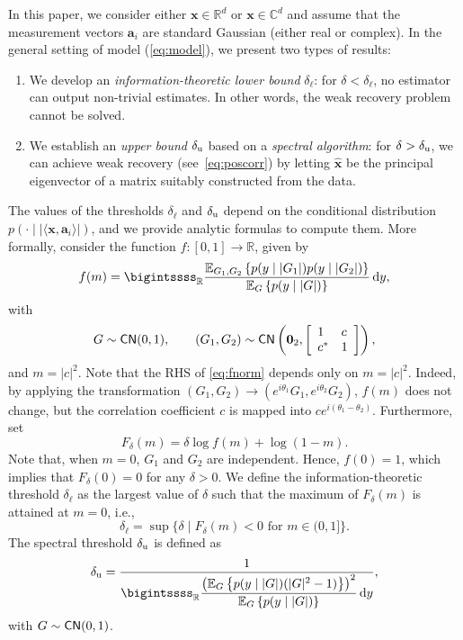 \documentclass[final,12pt]{colt2018}
\def\complex{{\mathbb C}}
\def\reals{{\mathbb R}}
\def\reals{{\mathbb R}}
\def\ba{{\boldsymbol a}}
\def\bx{{\boldsymbol x}}
\def\b0{{\boldsymbol 0}}
\def\cnormal{{\sf CN}}
\def\complex{{\mathbb C}}
\begin{document}
In this paper, we consider either $\bx\in \reals^d$ or $\bx\in\complex^d$ and assume that the measurement vectors
$\ba_i$ are standard Gaussian (either real or complex). In the general setting of model (\ref{eq:model}), we present two types of results:
%
\begin{enumerate}
\item We develop an \emph{information-theoretic lower bound} $\delta_{\ell}$: for $\delta < \delta_{\ell}$, no estimator can output non-trivial estimates.
In other words, the weak recovery problem cannot be solved. 
%
\item We establish an  \emph{upper bound} $\delta_{\rm u}$ based on a \emph{spectral algorithm}:
for $\delta > \delta_{\rm u}$, we can achieve weak recovery (see~\eqref{eq:poscorr}) by letting $\hat{\bx}$ be the principal
eigenvector of a matrix suitably constructed from the data.
%
\end{enumerate}
%
The values of the thresholds $\delta_{\ell}$ and $\delta_{\rm u}$ depend on the conditional distribution $p(\cdot \mid |\langle\bx, \ba_i \rangle|)$, and we provide analytic formulas to compute them. More formally, consider the function $f : [0, 1]\to {\mathbb R}$, given by 
\begin{equation}\label{eq:fnorm}
f(m) = \bigintssss_{\mathbb R}\frac{{\mathbb E}_{G_1, G_2}\left\{p(y\mid |G_1|)p(y\mid |G_2|)\right\}}{{\mathbb E}_{G}\left\{p(y\mid |G|)\right\}} \,{\rm d}y,
\end{equation}
with 
\begin{equation}
G\sim \cnormal(0, 1),\qquad (G_1, G_2)\sim\cnormal\left(\b0_2, \left[\begin{array}{ll}
1 & c \\ c^* & 1\\ 
\end{array}\right]\right),
\end{equation}
and $m=|c|^2$. Note that the RHS of \eqref{eq:fnorm} depends only on $m=|c|^2$. Indeed, by applying the transformation $(G_1, G_2)\to (e^{i\theta_1}G_1, e^{i\theta_2}G_2)$, $f(m)$ does not change, but the correlation coefficient $c$ is mapped into $ce^{i(\theta_1-\theta_2)}$. Furthermore, set
\begin{equation}\label{eq:defF}
F_{\delta}(m) = \delta \log f(m) + \log (1-m).
\end{equation}
Note that, when $m=0$, $G_1$ and $G_2$ are independent. Hence, $f(0)=1$, which implies that $F_{\delta}(0)=0$ for any $\delta >0$. We define the information-theoretic threshold $\delta_{\ell}$ as the largest value of $\delta$ such that the maximum of $F_{\delta}(m)$ is attained at $m=0$, i.e., 
\begin{equation}\label{eq:defdelta}
\delta_{\ell} = \sup \{\delta \mid F_{\delta}(m) < 0 \mbox{ for }m\in (0, 1]\}.
\end{equation}
The spectral threshold $\delta_{\rm u}$ is defined as
\begin{equation}\label{eq:defdeltau}
\delta_{\rm u} = \frac{1}{\displaystyle\bigintssss_{\mathbb R}\frac{\left({\mathbb E}_{G}\left\{p(y\mid |G|)(|G|^2-1)\right\}\right)^2}{{\mathbb E}_{G}\left\{p(y\mid |G|)\right\}} \,{\rm d}y},
\end{equation}
with $G\sim \cnormal(0, 1)$.
\end{document}

